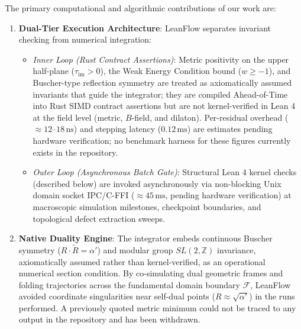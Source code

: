 \documentclass[11pt]{letter}
\providecommand{\numreconcile}[2]{#1}
\begin{document}
The primary computational and algorithmic contributions of our work are:
\begin{enumerate}
    \item \textbf{Dual-Tier Execution Architecture}: LeanFlow separates invariant checking from numerical integration:
    \begin{itemize}
        \item \emph{Inner Loop (Rust Contract Assertions)}: Metric positivity on the upper half-plane ($\tau_{\text{im}} > 0$), the Weak Energy Condition bound ($w \ge -1$), and Buscher-type reflection symmetry are treated as axiomatically assumed invariants that guide the integrator; they are compiled Ahead-of-Time into Rust SIMD contract assertions but are not kernel-verified in Lean 4 at the field level (metric, $B$-field, and dilaton). Per-residual overhead ($\numreconcile{\approx 12\text{--}18\,\text{ns}}{residual eval overhead}$) and stepping latency ($\numreconcile{0.12\,\text{ms}}{step latency}$) are estimates pending hardware verification; no benchmark harness for these figures currently exists in the repository.
        \item \emph{Outer Loop (Asynchronous Batch Gate)}: Structural Lean 4 kernel checks (described below) are invoked asynchronously via non-blocking Unix domain socket IPC/C-FFI ($\numreconcile{\approx 45\,\text{ms}}{IPC batch latency}$, pending hardware verification) at macroscopic simulation milestones, checkpoint boundaries, and topological defect extraction sweeps.
    \end{itemize}

    \item \textbf{Native Duality Engine}: The integrator embeds continuous Buscher symmetry ($R \cdot \widetilde{R} = \alpha'$) and modular group $SL(2,\mathbb{Z})$ invariance, axiomatically assumed rather than kernel-verified, as an operational numerical section condition. By co-simulating dual geometric frames and folding trajectories across the fundamental domain boundary $\mathcal{F}$, LeanFlow avoided coordinate singularities near self-dual points ($R \approx \sqrt{\alpha'}$) in the runs performed. A previously quoted metric minimum could not be traced to any output in the repository and has been withdrawn.


\end{enumerate}
\end{document}
